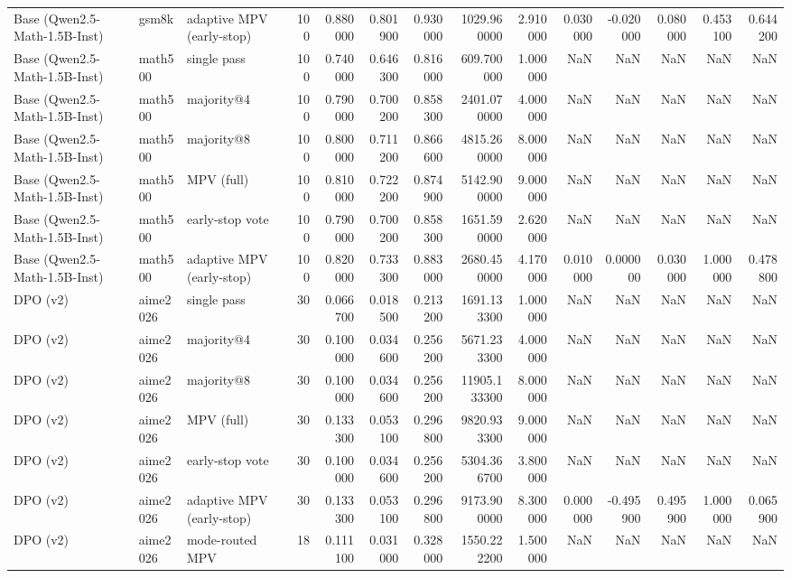 \begin{table}
\begin{tabular}{lllrrrrrrrrrrr}
Base (Qwen2.5-Math-1.5B-Inst) & gsm8k & adaptive MPV (early-stop) & 100 & 0.880000 & 0.801900 & 0.930000 & 1029.960000 & 2.910000 & 0.030000 & -0.020000 & 0.080000 & 0.453100 & 0.644200 \\
Base (Qwen2.5-Math-1.5B-Inst) & math500 & single pass & 100 & 0.740000 & 0.646300 & 0.816000 & 609.700000 & 1.000000 & NaN & NaN & NaN & NaN & NaN \\
Base (Qwen2.5-Math-1.5B-Inst) & math500 & majority@4 & 100 & 0.790000 & 0.700200 & 0.858300 & 2401.070000 & 4.000000 & NaN & NaN & NaN & NaN & NaN \\
Base (Qwen2.5-Math-1.5B-Inst) & math500 & majority@8 & 100 & 0.800000 & 0.711200 & 0.866600 & 4815.260000 & 8.000000 & NaN & NaN & NaN & NaN & NaN \\
Base (Qwen2.5-Math-1.5B-Inst) & math500 & MPV (full) & 100 & 0.810000 & 0.722200 & 0.874900 & 5142.900000 & 9.000000 & NaN & NaN & NaN & NaN & NaN \\
Base (Qwen2.5-Math-1.5B-Inst) & math500 & early-stop vote & 100 & 0.790000 & 0.700200 & 0.858300 & 1651.590000 & 2.620000 & NaN & NaN & NaN & NaN & NaN \\
Base (Qwen2.5-Math-1.5B-Inst) & math500 & adaptive MPV (early-stop) & 100 & 0.820000 & 0.733300 & 0.883000 & 2680.450000 & 4.170000 & 0.010000 & 0.000000 & 0.030000 & 1.000000 & 0.478800 \\
DPO (v2) & aime2026 & single pass & 30 & 0.066700 & 0.018500 & 0.213200 & 1691.133300 & 1.000000 & NaN & NaN & NaN & NaN & NaN \\
DPO (v2) & aime2026 & majority@4 & 30 & 0.100000 & 0.034600 & 0.256200 & 5671.233300 & 4.000000 & NaN & NaN & NaN & NaN & NaN \\
DPO (v2) & aime2026 & majority@8 & 30 & 0.100000 & 0.034600 & 0.256200 & 11905.133300 & 8.000000 & NaN & NaN & NaN & NaN & NaN \\
DPO (v2) & aime2026 & MPV (full) & 30 & 0.133300 & 0.053100 & 0.296800 & 9820.933300 & 9.000000 & NaN & NaN & NaN & NaN & NaN \\
DPO (v2) & aime2026 & early-stop vote & 30 & 0.100000 & 0.034600 & 0.256200 & 5304.366700 & 3.800000 & NaN & NaN & NaN & NaN & NaN \\
DPO (v2) & aime2026 & adaptive MPV (early-stop) & 30 & 0.133300 & 0.053100 & 0.296800 & 9173.900000 & 8.300000 & 0.000000 & -0.495900 & 0.495900 & 1.000000 & 0.065900 \\
DPO (v2) & aime2026 & mode-routed MPV & 18 & 0.111100 & 0.031000 & 0.328000 & 1550.222200 & 1.500000 & NaN & NaN & NaN & NaN & NaN \\

\end{tabular}
\end{table}
